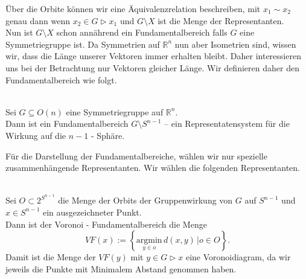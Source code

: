 Über die Orbite können wir eine Äquivalenzrelation beschreiben, mit $x_1 \sim x_2$ genau dann wenn $x_2 \in G \rhd x_1$ und $G \setminus X$ ist die Menge der Representanten.\\

Nun ist $G \setminus X$ schon annährend ein Fundamentalbereich falls $G$ eine Symmetriegruppe ist. Da Symmetrien auf $\mathbb{R}^n$ nun aber Isometrien sind, wissen wir, dass die Länge unserer Vektoren immer erhalten bleibt. Daher interessieren uns bei der Betrachtung nur Vektoren gleicher Länge. Wir definieren daher den Fundamentalbereich wie folgt.\\

\begin{definition}[Fundamentalbereich]\label{fundamentalbereich:def} \mbox{}\\
   Sei $G \subseteq O(n)$ eine Symmetriegruppe auf $\mathbb{R}^n$.\\

   Dann ist ein Fundamentalbereich $G \setminus S^{n-1}$ -- ein Representatensystem für die Wirkung auf die $n-1$ - Sphäre.
\end{definition}

Für die Darstellung der Fundamentalbereiche, wählen wir nur spezielle zusammenhängende Representanten. Wir wählen die folgenden Representanten.

\begin{definition}\label{fundamentalbereich:voronoi} \mbox{}\\
   Sei $O \subset 2^{S^{n-1}}$ die Menge der Orbits der Gruppenwirkung von $G$ auf $S^{n-1}$ und $x \in S^{n-1}$ ein ausgezeichneter Punkt.\\

   Dann ist der Voronoi - Fundamentalbereich die Menge
   $$
      VF(x) := \left\{ \underset{y\in o}{\text{argmin}} \, d(x,y) \, |  o \in O\right\}.
   $$
   Damit ist die Menge der $VF(y)$ mit $y \in G \rhd x$ eine Voronoidiagram, da wir jeweils die Punkte mit Minimalem Abstand genommen haben.
\end{definition}


